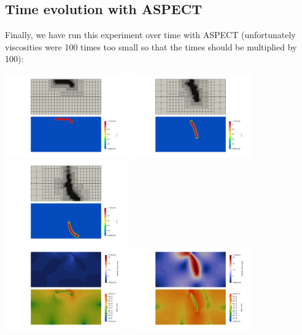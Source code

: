 \subsection*{Time evolution with ASPECT}
Finally, we have run this experiment over time with ASPECT (unfortunately viscosities were 100 times 
too small so that the times should be multiplied by 100):
\begin{center}
\includegraphics[width=5.26cm]{python_codes/fieldstone_55/images/aspect/grid_comp0000}
\includegraphics[width=5.26cm]{python_codes/fieldstone_55/images/aspect/grid_comp0090}
\includegraphics[width=5.26cm]{python_codes/fieldstone_55/images/aspect/grid_comp0180}\\
\includegraphics[width=5.26cm]{python_codes/fieldstone_55/images/aspect/vel_sr0000}
\includegraphics[width=5.26cm]{python_codes/fieldstone_55/images/aspect/vel_sr0090}

\end{center}
